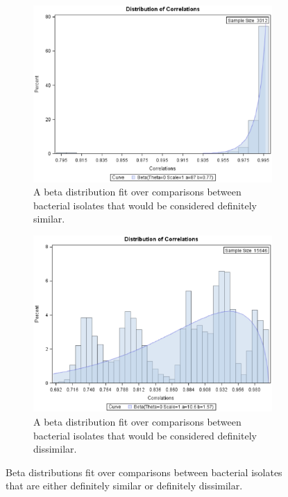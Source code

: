 \documentclass[12pt]{ucthesis}
\begin{document}
      \begin{figure}[t]
         \centering
         \begin{subfigure}[t]{0.45\textwidth}
            \centering
            \includegraphics[width=\textwidth]{graphics/BetaDist_Match.eps}
            \caption{A beta distribution fit over comparisons between bacterial
                     isolates that would be considered definitely similar.}
            \label{fig:beta_match}
         \end{subfigure}
         \hfill
         \begin{subfigure}[t]{0.45\textwidth}
            \centering
            \includegraphics[width=\textwidth]{graphics/BetaDist_Mismatch.eps}
            \caption{A beta distribution fit over comparisons between bacterial
                     isolates that would be considered definitely dissimilar.}
            \label{fig:beta_mismatch}
         \end{subfigure}
         \caption{Beta distributions fit over comparisons between bacterial
                  isolates that are either definitely similar or definitely
                  dissimilar.}
         \label{fig:match_mismatch}
      \end{figure}
\end{document}
